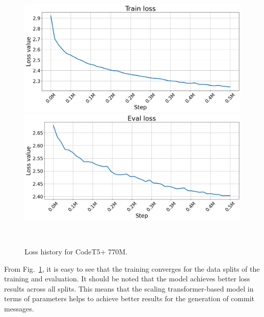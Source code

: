 \begin{figure}[H]
    \centering
    \includegraphics[scale=0.35]{figs/t5big_train_loss.png} \\
    \includegraphics[scale=0.35]{figs/t5big_eval_loss.png}
    \caption{Loss history for CodeT5+ 770M.}
    ~\label{fig:big_model_loss}
\end{figure}

From Fig.~\ref{fig:big_model_loss}, it is easy to see that the training converges for the data splits of the training and evaluation. It should be noted that the model achieves better loss results across all splits. This means that the scaling transformer-based model in terms of parameters helps to achieve better results for the generation of commit messages. 

